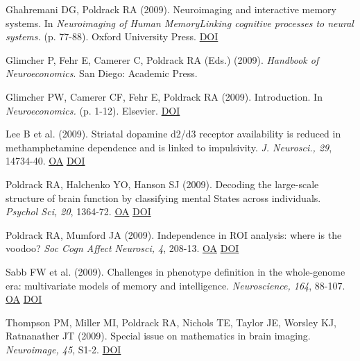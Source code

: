 Ghahremani DG, Poldrack RA (2009). Neuroimaging and interactive memory systems. In \textit{Neuroimaging of Human MemoryLinking cognitive processes to neural systems.} (p. 77-88). Oxford University Press. \href{http://dx.doi.org/10.1093/acprof:oso/9780199217298.003.0006}{DOI} \vspace{2mm}

Glimcher P, Fehr E, Camerer C, Poldrack RA (Eds.) (2009).  \textit{Handbook of Neuroeconomics}. San Diego: Academic Press. \vspace{2mm}

Glimcher PW, Camerer CF, Fehr E, Poldrack RA (2009). Introduction. In \textit{Neuroeconomics.} (p. 1-12). Elsevier. \href{http://dx.doi.org/10.1016/b978-0-12-374176-9.00001-4}{DOI} \vspace{2mm}

Lee B et al. (2009). Striatal dopamine d2/d3 receptor availability is reduced in methamphetamine dependence and is linked to impulsivity. \textit{J. Neurosci., 29}, 14734-40. \href{https://www.ncbi.nlm.nih.gov/pmc/articles/PMC2822639}{OA} \href{http://dx.doi.org/10.1523/jneurosci.3765-09.2009}{DOI} \vspace{2mm}

Poldrack RA, Halchenko YO, Hanson SJ (2009). Decoding the large-scale structure of brain function by classifying mental States across individuals. \textit{Psychol Sci, 20}, 1364-72. \href{https://www.ncbi.nlm.nih.gov/pmc/articles/PMC2935493}{OA} \href{http://dx.doi.org/10.1111/j.1467-9280.2009.02460.x}{DOI} \vspace{2mm}

Poldrack RA, Mumford JA (2009). Independence in ROI analysis: where is the voodoo? \textit{Soc Cogn Affect Neurosci, 4}, 208-13. \href{https://www.ncbi.nlm.nih.gov/pmc/articles/PMC2686233}{OA} \href{http://dx.doi.org/10.1093/scan/nsp011}{DOI} \vspace{2mm}

Sabb FW et al. (2009). Challenges in phenotype definition in the whole-genome era: multivariate models of memory and intelligence. \textit{Neuroscience, 164}, 88-107. \href{https://www.ncbi.nlm.nih.gov/pmc/articles/PMC2766544}{OA} \href{http://dx.doi.org/10.1016/j.neuroscience.2009.05.013}{DOI} \vspace{2mm}

Thompson PM, Miller MI, Poldrack RA, Nichols TE, Taylor JE, Worsley KJ, Ratnanather JT (2009). Special issue on mathematics in brain imaging. \textit{Neuroimage, 45}, S1-2. \href{http://dx.doi.org/10.1016/j.neuroimage.2008.10.033}{DOI} \vspace{2mm}

